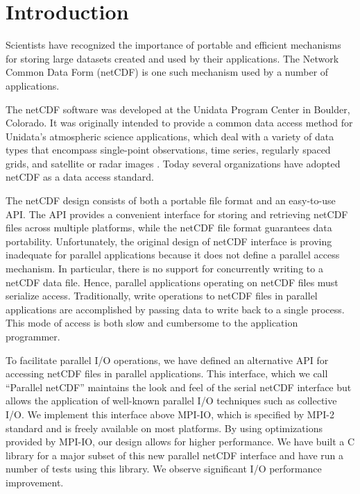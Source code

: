 \documentclass[10pt,twocolumn]{article}          %
\begin{document}
\section{Introduction}

Scientists have recognized the importance of portable and
efficient mechanisms for storing large datasets created and used
by their applications. The Network Common Data Form (netCDF)
\cite{ReDa90, RDED97} is one such mechanism used by a number of
applications.

The netCDF software was developed at the Unidata Program Center in Boulder, Colorado. It
was originally intended to provide a common data access method for Unidata's atmospheric science applications,
which deal with a variety of data types that encompass single-point observations, time series,
regularly spaced grids, and satellite or radar images \cite{RDED97}. Today several organizations
have adopted netCDF as a data access standard.

The netCDF design consists of both a portable file format and an
easy-to-use API. The API provides a convenient interface for
storing and retrieving netCDF files across multiple platforms,
while the netCDF file format guarantees data portability.
Unfortunately, the original design of netCDF interface is proving
inadequate for parallel applications because it does not
define a parallel access mechanism. In particular, there is no
support for concurrently writing to a netCDF data file. 
Hence, parallel applications operating on netCDF files must
serialize access. Traditionally, write operations to netCDF files
in parallel applications are accomplished by passing data to write
back to a single process. This mode of access is both slow and cumbersome
to the application programmer.

To facilitate parallel I/O operations, we have defined an alternative API for accessing netCDF
files in parallel applications. This interface, which we call ``Parallel netCDF'' maintains the look
and feel of the serial netCDF interface but allows the application of well-known
parallel I/O techniques such as collective I/O. We implement this interface above MPI-IO, which is
specified by MPI-2 standard \cite{GrLT99, Mess97, GLDS96} and is freely available on most platforms.
By using optimizations provided by MPI-IO, our design allows for higher performance. We 
have built a C library for a major subset of this new parallel netCDF interface and have run a
number of tests using this library. We observe significant I/O performance improvement.
\end{document}
